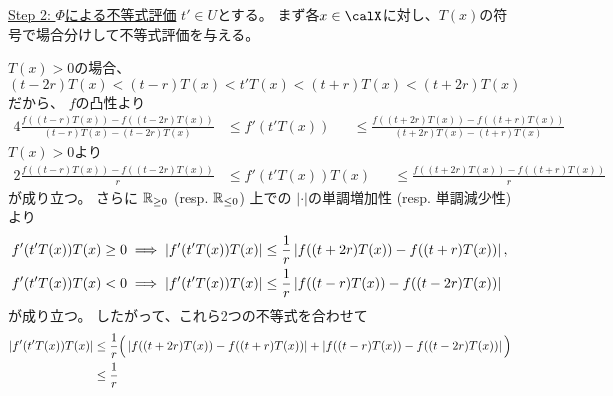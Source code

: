 \documentclass[report]{jlreq}
\begin{document}
\begin{answer}
    \uline{Step 2: $\Phi$による不等式評価} \quad
    $t' \in U$とする。
    まず各$x \in \calX$に対し、$T(x)$の符号で場合分けして不等式評価を与える。

    $T(x) > 0$の場合、
    $(t - 2r)T(x) < (t - r)T(x) < t'T(x) < (t + r)T(x) < (t + 2r)T(x)$
    だから、
    $f$の凸性より
    \begin{alignat}{4}
        \frac{
            f((t - r)T(x)) - f((t - 2r)T(x))
        }{
            (t - r)T(x) - (t - 2r)T(x)
        }
            &\le
                f'(t'T(x))
            &&\le
                \frac{
                    f((t + 2r)T(x)) - f((t + r)T(x))
                }{
                    (t + 2r)T(x) - (t + r)T(x)
                }
    \end{alignat}
    $T(x) > 0$より
    \begin{alignat}{2}
        \frac{
            f((t - r)T(x)) - f((t - 2r)T(x))
        }{
            r
        }
            &\le
                f'(t'T(x)) T(x)
            &&\le
                \frac{
                    f((t + 2r)T(x)) - f((t + r)T(x))
                }{
                    r
                }
    \end{alignat}
    が成り立つ。
    さらに
    $\mathbb{R}_{\ge 0}$ (resp. $\mathbb{R}_{\le 0}$) 上での
    $| \cdot |$の単調増加性 (resp. 単調減少性) より
    \begin{alignat}{1}
        f'(t'T(x)) T(x) \ge 0
            &\implies
                |f'(t'T(x)) T(x)|
                    \le
                        \frac{1}{r}
                        \left|{
                            f((t + 2r)T(x)) - f((t + r)T(x))
                        }\right|,
            \\
        f'(t'T(x)) T(x) < 0
            &\implies
                |f'(t'T(x)) T(x)|
                    \le
                        \frac{1}{r}
                        \left|{
                            f((t - r)T(x)) - f((t - 2r)T(x))
                        }\right|
    \end{alignat}
    が成り立つ。
    したがって、これら2つの不等式を合わせて
    \begin{alignat}{1}
        |f'(t'T(x)) T(x)|
            &\le
                \frac{1}{r}
                \Big(
                    \myabs{
                        f((t + 2r)T(x)) - f((t + r)T(x))
                    }
                    +
                    \myabs{
                        f((t - r)T(x)) - f((t - 2r)T(x))
                    }
                \Big)
                \\
            &\le
                \frac{1}{r}

\end{alignat}
\end{answer}
\end{document}
